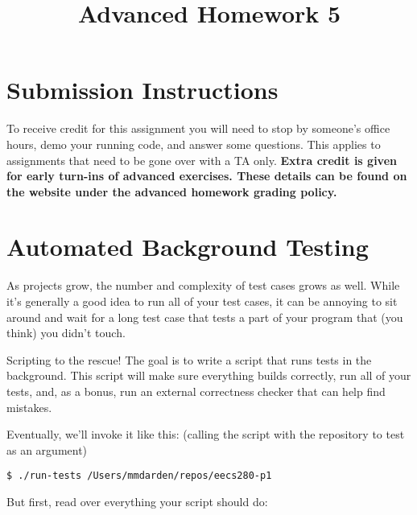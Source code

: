 \documentclass{article}
\begin{document}
\fancyfoot[C]{\color{gray} \thepage~/~\pageref*{LastPage}}
\pagestyle{fancyplain}

\title{\textbf{Advanced Homework 5\\}}
\author{\textbf{\color{red}{Due: Wednesday, October 17th, 11:59PM (Hard Deadline)}}}
\date{}
\maketitle


\section*{Submission Instructions}
To receive credit for this assignment you will need to stop by someone's
office hours, demo your running code, and answer some questions. \textbf{\color{red}{Make sure
to check the office hour schedule as the real due date is at the last office
hours before the date listed above.}} This applies to assignments that need to be gone over with a TA only.
\textbf{Extra credit is given for early turn-ins of advanced exercises. These details can be found on the website under the advanced homework grading policy.}


\section{Automated Background Testing}

As projects grow, the number and complexity of test cases grows as well. While
it's generally a good idea to run all of your test cases, it can be annoying
to sit around and wait for a long test case that tests a part of your program
that (you think) you didn't touch.

\medskip
\noindent
Scripting to the rescue! The goal is to write a script that runs tests in the
background. This script will make sure everything builds correctly, run all of
your tests, and, as a bonus, run an external correctness checker that can help
find mistakes.

\medskip
\noindent
Eventually, we'll invoke it like this: (calling the script with the repository to test as an argument)
\begin{lstlisting}
$ ./run-tests /Users/mmdarden/repos/eecs280-p1
\end{lstlisting}

\noindent
But first, read over everything your script should do:
\end{document}
